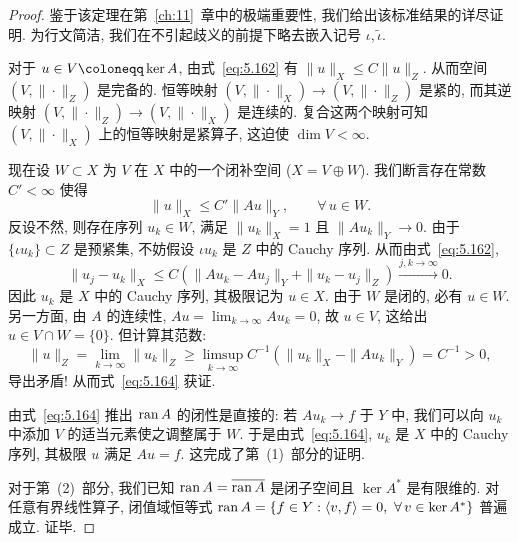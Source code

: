 \begin{proof}
鉴于该定理在第~\ref{ch:11}~章中的极端重要性, 我们给出该标准结果的详尽证明. 为行文简洁, 我们在不引起歧义的前提下略去嵌入记号 $\iota, \tilde{\iota}$.

对于 $u \in V \defeq \ker A$, 由式~\eqref{eq:5.162} 有 $\|u\|_X \le C \|u\|_Z$. 从而空间 $(V, \|\cdot\|_Z)$ 是完备的. 恒等映射 $(V, \|\cdot\|_X) \to (V, \|\cdot\|_Z)$ 是紧的, 而其逆映射 $(V, \|\cdot\|_Z) \to (V, \|\cdot\|_X)$ 是连续的. 复合这两个映射可知 $(V, \|\cdot\|_X)$ 上的恒等映射是紧算子, 这迫使 $\dim V < \infty$.

现在设 $W \subset X$ 为 $V$ 在 $X$ 中的一个闭补空间 ($X = V \oplus W$). 我们断言存在常数 $C' < \infty$ 使得
\begin{equation}\label{eq:5.164}
    \|u\|_X \le C' \|A u\|_Y, \qquad \forall\,u \in W.
\end{equation}
反设不然, 则存在序列 $u_k \in W$, 满足 $\|u_k\|_X = 1$ 且 $\|A u_k\|_Y \to 0$. 由于 $\{\iota u_k\} \subset Z$ 是预紧集, 不妨假设 $\iota u_k$ 是 $Z$ 中的 Cauchy 序列. 从而由式~\eqref{eq:5.162},
\begin{equation}\label{eq:5.165}
    \|u_j - u_k\|_X \le C \left( \|A u_k - A u_j\|_Y + \|u_k - u_j\|_Z \right) \xrightarrow{j, k \to \infty} 0.
\end{equation}
因此 $u_k$ 是 $X$ 中的 Cauchy 序列, 其极限记为 $u \in X$. 由于 $W$ 是闭的, 必有 $u \in W$. 另一方面, 由 $A$ 的连续性, $A u = \lim_{k\to\infty} A u_k = 0$, 故 $u \in V$, 这给出 $u \in V \cap W = \{0\}$. 但计算其范数:
\begin{equation}\label{eq:5.166}
    \|u\|_Z = \lim_{k\to\infty} \|u_k\|_Z \ge \limsup_{k\to\infty} C^{-1} \left( \|u_k\|_X - \|A u_k\|_Y \right) = C^{-1} > 0,
\end{equation}
导出矛盾! 从而式~\eqref{eq:5.164} 获证.

由式~\eqref{eq:5.164} 推出 $\operatorname{ran} A$ 的闭性是直接的: 若 $A u_k \to f$ 于 $Y$ 中, 我们可以向 $u_k$ 中添加 $V$ 的适当元素使之调整属于 $W$. 于是由式~\eqref{eq:5.164}, $u_k$ 是 $X$ 中的 Cauchy 序列, 其极限 $u$ 满足 $A u = f$. 这完成了第~(1)~部分的证明.

对于第~(2)~部分, 我们已知 $\operatorname{ran} A = \overline{\operatorname{ran} A}$ 是闭子空间且 $\ker A^*$ 是有限维的. 对任意有界线性算子, 闭值域恒等式 $\ran A = \{f \in Y : \langle v, f \rangle = 0, \ \forall\,v \in \ker A^*\}$ 普遍成立. 证毕.
\end{proof}

